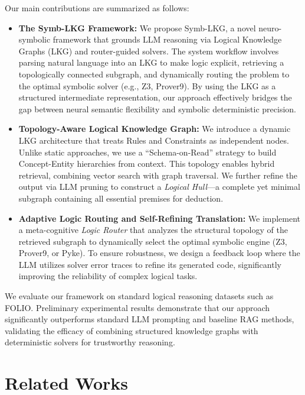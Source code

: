 \documentclass{article}
\theoremstyle{plain}
\theoremstyle{definition}
\theoremstyle{remark}
\begin{document}
Our main contributions are summarized as follows:
\begin{itemize}
\item \textbf{The Symb-LKG Framework:} 
We propose Symb-LKG, a novel neuro-symbolic framework that grounds LLM reasoning via Logical Knowledge Graphs (LKG) and router-guided solvers. The system workflow involves parsing natural language into an LKG to make logic explicit, retrieving a topologically connected subgraph, and dynamically routing the problem to the optimal symbolic solver (e.g., Z3, Prover9). By using the LKG as a structured intermediate representation, our approach effectively bridges the gap between neural semantic flexibility and symbolic deterministic precision.

\item \textbf{Topology-Aware Logical Knowledge Graph:} 
We introduce a dynamic LKG architecture that treats Rules and Constraints as independent nodes. Unlike static approaches, we use a ``Schema-on-Read'' strategy to build Concept-Entity hierarchies from context. This topology enables hybrid retrieval, combining vector search with graph traversal. We further refine the output via LLM pruning to construct a \textit{Logical Hull}—a complete yet minimal subgraph containing all essential premises for deduction.

\item \textbf{Adaptive Logic Routing and Self-Refining Translation:} 
We implement a meta-cognitive \textit{Logic Router} that analyzes the structural topology of the retrieved subgraph to dynamically select the optimal symbolic engine (Z3, Prover9, or Pyke). To ensure robustness, we design a feedback loop where the LLM utilizes solver error traces to refine its generated code, significantly improving the reliability of complex logical tasks.
\end{itemize}

We evaluate our framework on standard logical reasoning datasets such as FOLIO. Preliminary experimental results demonstrate that our approach significantly outperforms standard LLM prompting and baseline RAG methods, validating the efficacy of combining structured knowledge graphs with deterministic solvers for trustworthy reasoning.

\section{Related Works}
\end{document}

